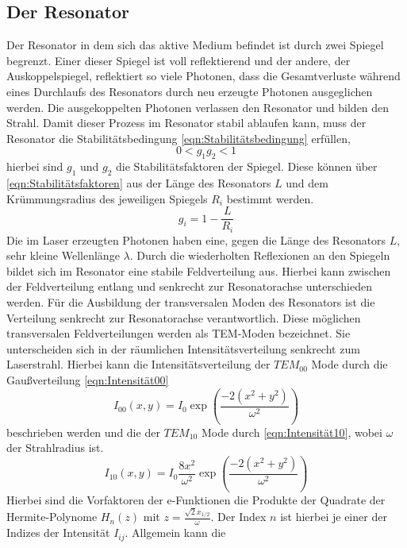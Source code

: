 \subsection{Der Resonator}
Der Resonator in dem sich das aktive Medium befindet ist durch zwei Spiegel begrenzt. Einer dieser Spiegel ist voll reflektierend und der andere, der Auskoppelspiegel, reflektiert so viele Photonen, dass die Gesamtverluste während eines
Durchlaufs des Resonators durch neu erzeugte Photonen ausgeglichen werden. Die ausgekoppelten Photonen verlassen den Resonator und bilden den Strahl. Damit dieser Prozess im Resonator stabil ablaufen kann, muss der Resonator die
Stabilitätsbedingung \ref{eqn:Stabilitätsbedingung} erfüllen,
\begin{equation}
	0 < g_1 g_2 < 1
\label{eqn:Stabilitätsbedingung}
\end{equation}
hierbei sind $g_1$ und $g_2$ die Stabilitätsfaktoren der Spiegel. Diese können über \ref{eqn:Stabilitätsfaktoren} aus der Länge des Resonators $L$ und dem Krümmungsradius des jeweiligen Spiegels $R_i$ bestimmt werden.
\begin{equation}
	g_i = 1 - \frac{L}{R_i}
\label{eqn:Stabilitätsfaktoren}
\end{equation}
Die im Laser erzeugten Photonen haben eine, gegen die Länge des Resonators $L$, sehr kleine Wellenlänge $\lambda$. Durch die wiederholten Reflexionen an den Spiegeln bildet sich im Resonator eine stabile Feldverteilung aus. Hierbei kann
zwischen der Feldverteilung entlang und senkrecht zur Resonatorachse unterschieden werden. Für die Ausbildung der transversalen Moden des Resonators ist die Verteilung senkrecht zur Resonatorachse verantwortlich. Diese möglichen transversalen 
Feldverteilungen werden als TEM-Moden bezeichnet. Sie unterscheiden sich in der räumlichen Intensitätsverteilung senkrecht zum Laserstrahl. Hierbei kann die Intensitätsverteilung der $TEM_{00}$ Mode durch die 
Gaußverteilung \ref{eqn:Intensität00} 
\begin{equation}
	I_{00}(x, y) = I_0 \exp{\left(\frac{-2(x^2+y^2)}{\omega^2}\right)}
\label{eqn:Intensität00}
\end{equation}
beschrieben werden und die der $TEM_{10}$ Mode durch \ref{eqn:Intensität10}, wobei $\omega$ der Strahlradius ist.
\begin{equation}
	I_{10}(x, y) = I_0 \frac{8x^2}{\omega^2} \exp{\left(\frac{-2(x^2+y^2)}{\omega^2}\right)}
\label{eqn:Intensität10}
\end{equation}
Hierbei sind die Vorfaktoren der e-Funktionen die Produkte der Quadrate der Hermite-Polynome $H_n(z)$ mit $z = \frac{\sqrt{2}x_{1/2}}{\omega}$. Der Index $n$ ist hierbei je einer der Indizes der Intensität $I_{ij}$. Allgemein kann die
